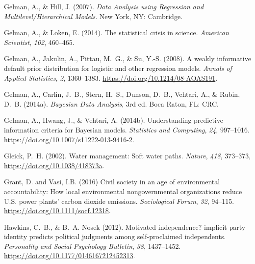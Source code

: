 \documentclass[draft,linenumbers]{agujournal}\usepackage{knitr}
\begin{document}
\begin{thebibliography}{33}
  Gelman, A., \& Hill, J. (2007).
  \textit{Data Analysis using Regression and Multilevel/Hierarchical Models}.
  New York, NY: Cambridge.

  Gelman, A., \& Loken, E. (2014).
  The statistical crisis in science.
  \textit{American Scientist}, \textit{102}, 460--465.

  Gelman, A., Jakulin, A., Pittau, M.~G., \& Su, Y.-S. (2008).
  A weakly informative default prior distribution for logistic and other
  regression models.
  \textit{Annals of Applied Statistics}, \textit{2}, 1360--1383.
  \url{https://doi.org/10.1214/08-AOAS191}.

  Gelman, A., Carlin, J.~B., Stern, H.~S., Dunson, D.~B., Vehtari, A., \&
  Rubin, D.~B. (2014a).
  \textit{{B}ayesian Data Analysis}, 3rd ed.
  Boca Raton, FL: CRC.

  Gelman, A., Hwang, J., \& Vehtari, A. (2014b).
  Understanding predictive information criteria for Bayesian models.
  \textit{Statistics and Computing}, \textit{24}, 997--1016.
  \url{https://doi.org/10.1007/s11222-013-9416-2}.

  Gleick, P.~H. (2002).
  Water management: {S}oft water paths.
  \textit{Nature},
  \textit{418}, 373--373, \url{https://doi.org/10.1038/418373a}.

  Grant, D. and Vasi, I.B. (2016)
  Civil society in an age of environmental accountability:
  How local environmental nongovernmental organizations reduce
  U.S. power plants' carbon dioxide emissions.
  \textit{Sociological Forum}, \textit{32}, 94--115.
  \url{https://doi.org/10.1111/socf.12318}.

  Hawkins, C.~B., \& B.~A. Nosek (2012).
  Motivated independence? implicit party identity predicts political judgments
  among self-proclaimed independents.
  \textit{Personality and Social Psychology Bulletin}, \textit{38}, 1437--1452.
  \url{https://doi.org/10.1177/0146167212452313}.


\end{thebibliography}
\end{document}
